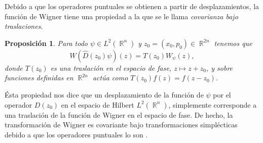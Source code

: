 \documentclass[a4paper,11pt]{report}
\DeclareMathOperator{\R}{\mathbb{R}}
\DeclareMathOperator{\Sz}{\mathcal S}
\newtheorem{proposition}{Proposición}
\begin{document}
  Debido a que los operadores puntuales se obtienen a partir
  de desplazamientos, la función de Wigner tiene una
  propiedad a la que se le llama \textit{covarianza bajo
  traslaciones}. 
  \begin{proposition}
    Para todo $\psi \in L^2(\R^{n})$ y $z_0 = (x_0,p_0) \in
    \R^{2n}$ tenemos que
    \begin{equation}
      W(\hat{D}(z_0)\psi)(z)
      = T(z_0)W_\psi(z),
    \end{equation} 
    donde $T(z_0)$ es una traslación en el espacio de fase,
    $z \mapsto z + z_0$, y sobre funciones definidas en
    $\R^{2n}$ actúa como $T(z_0)f(z) = f(z-z_0)$.
  \end{proposition}
  Ésta propiedad nos dice que un desplazamiento de la
  función de $\psi$ por el operador $D(z_0)$ en el espacio
  de Hilbert $L^2(\R^{n})$, simplemente corresponde a una
  traslación de la función de Wigner en el espacio de fase.
  De hecho, la transformación de Wigner es covariante bajo
  transformaciones simplécticas debido a que los operadores
  puntuales lo son \cite{gosson2017}.
  
\end{document}
